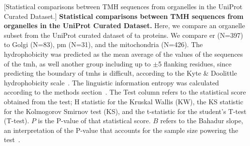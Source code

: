 \begin{table}[htbp]
\centering
{}[Statistical comparisons between TMH sequences from organelles in the UniProt Curated Dataset.]
{\textbf{Statistical comparisons between TMH sequences from organelles in the UniProt Curated Dataset.}
Here, we compare an organelle subset from the UniProt curated dataset of \gls{ta} proteins.
We compare \gls{er} (N=397) to Golgi (N=83), \gls{pm} (N=31), and the mitochondria (N=426).
The hydrophobicity was predicted as the mean average of the values of the sequences of the \gls{tmh}, as well another group including up to $\pm$5 flanking residues, since predicting the boundary of \gls{tmh}s is difficult, according to the Kyte \& Doolittle hydrophobicity scale~\cite{Kyte1982}.
The linguistic information entropy was calculated according to the methods section~\cite{Shannon1948}.
The Test column refers to the statistical score obtained from the test; H statistic for the Kruskal Wallis (KW), the KS statistic for the Kolmogorov Smirnov test (KS), and the t-statistic for the student's T-test (T-test).
$P$ is the P-value of that statistical score.
$B$ refers to the Bahadur slope, an interpretation of the P-value that accounts for the sample size powering the test~\cite{Bahadur1967, Bahadur1971}.}
    \tiny


\end{table}
